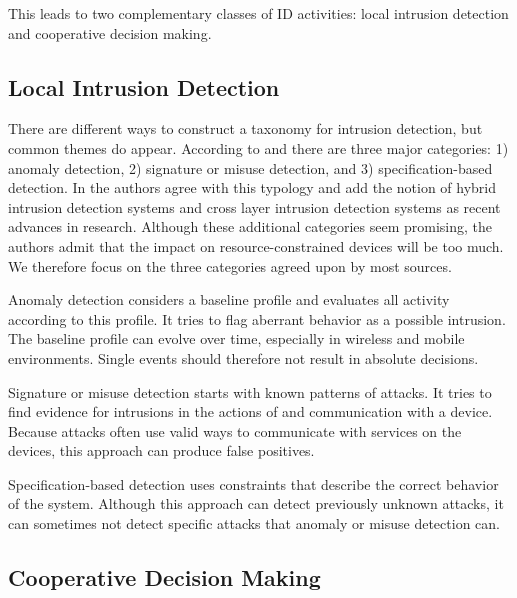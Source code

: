 \documentclass[conference]{IEEEtran}
\begin{document}
This leads to two complementary classes of ID activities: local intrusion
detection and cooperative decision making.

\subsection{Local Intrusion Detection}
\label{detection}

There are different ways to construct a taxonomy for intrusion detection, but
common themes do appear. According to \cite{mishra2004intrusion} and
\cite{ioannis2007towards} there are three major categories: 1) anomaly
detection, 2) signature or misuse detection, and 3) specification-based
detection. In \cite{alrajeh2013intrusion} the authors agree with this typology
and add the notion of hybrid intrusion detection systems and cross layer
intrusion detection systems as recent advances in research. Although these
additional categories seem promising, the authors admit that the impact on
resource-constrained devices will be too much. We therefore focus on the three
categories agreed upon by most sources.

\begin{LaTeXdescription}
  
  \item[Anomaly detection] considers a baseline profile and evaluates all
  activity according to this profile. It tries to flag aberrant behavior as a
  possible intrusion. The baseline profile can evolve over time, especially in
  wireless and mobile environments. Single events should therefore not result
  in absolute decisions.
  
  \item[Signature or misuse detection] starts with known patterns of attacks.
  It tries to find evidence for intrusions in the actions of and communication
  with a device. Because attacks often use valid ways to communicate with
  services on the devices, this approach can produce false positives.
  
  \item[Specification-based detection] uses constraints that describe the
  correct behavior of the system. Although this approach can detect previously
  unknown attacks, it can sometimes not detect specific attacks that anomaly or
  misuse detection can.
  
\end{LaTeXdescription}

\subsection{Cooperative Decision Making}
\label{coorperative}
\end{document}
